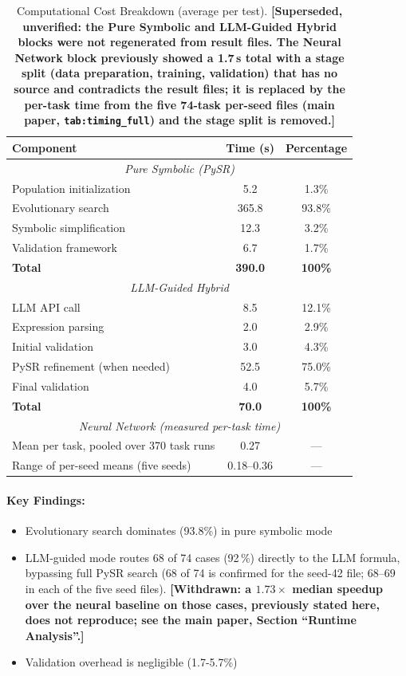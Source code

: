 \documentclass[twoside,11pt]{article}
\begin{document}
\begin{table}[H]
\centering
\caption{Computational Cost Breakdown (average per test).
  \textbf{[Superseded, unverified: the Pure Symbolic and LLM-Guided Hybrid blocks
  were not regenerated from result files. The Neural Network block previously showed a
  1.7\,s total with a stage split (data preparation, training, validation) that has no
  source and contradicts the result files; it is replaced by the per-task time from the
  five 74-task per-seed files (main paper, \texttt{tab:timing\_full}) and the stage split
  is removed.]}}
\label{tab:timing_breakdown}
\begin{tabular}{@{}lcc@{}}
\toprule
\textbf{Component} & \textbf{Time (s)} & \textbf{Percentage} \\
\midrule
\multicolumn{3}{c}{\textit{Pure Symbolic (PySR)}} \\
\midrule
Population initialization & 5.2 & 1.3\% \\
Evolutionary search & 365.8 & 93.8\% \\
Symbolic simplification & 12.3 & 3.2\% \\
Validation framework & 6.7 & 1.7\% \\
\midrule
\textbf{Total} & \textbf{390.0} & \textbf{100\%} \\
\midrule
\multicolumn{3}{c}{\textit{LLM-Guided Hybrid}} \\
\midrule
LLM API call & 8.5 & 12.1\% \\
Expression parsing & 2.0 & 2.9\% \\
Initial validation & 3.0 & 4.3\% \\
PySR refinement (when needed) & 52.5 & 75.0\% \\
Final validation & 4.0 & 5.7\% \\
\midrule
\textbf{Total} & \textbf{70.0} & \textbf{100\%} \\
\midrule
\multicolumn{3}{c}{\textit{Neural Network (measured per-task time)}} \\
\midrule
Mean per task, pooled over 370 task runs & 0.27 & --- \\
Range of per-seed means (five seeds) & 0.18--0.36 & --- \\
\bottomrule
\end{tabular}
\end{table}

\paragraph{Key Findings:}
\begin{itemize}
\item Evolutionary search dominates (93.8\%) in pure symbolic mode
\item LLM-guided mode routes 68 of 74 cases (92\,\%) directly to the LLM formula, bypassing full PySR search (68 of 74 is confirmed for the seed-42 file; $68$--$69$ in each of the five seed files). \textbf{[Withdrawn: a $1.73\times$ median speedup over the neural baseline on those cases, previously stated here, does not reproduce; see the main paper, Section ``Runtime Analysis''.]}
\item Validation overhead is negligible (1.7-5.7\%)
\end{itemize}
\end{document}
